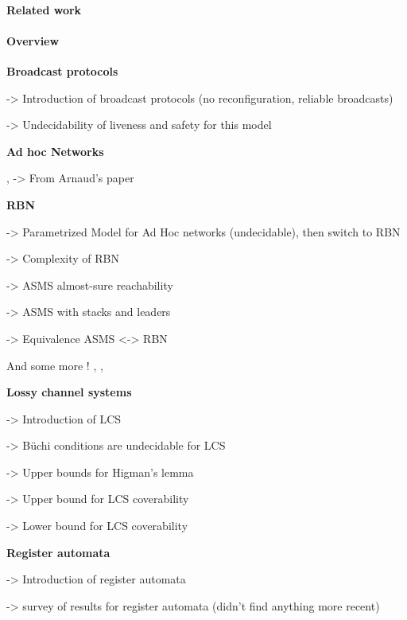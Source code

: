 \paragraph*{Related work}


\paragraph*{Overview}



	\textbf{Broadcast protocols}

	\cite{emerson1998model} -> Introduction of broadcast protocols (no reconfiguration, reliable broadcasts)
	
	\cite{EsparzaFM1999verification} -> Undecidability of liveness and safety for this model

	\textbf{Ad hoc Networks}

	\cite{Godskesen2007calculus}, \cite{Merro2007observational} -> From Arnaud's paper

	\textbf{RBN}
	
	\cite{DelzannoSZ2010Adhoc} -> Parametrized Model for Ad Hoc networks (undecidable), then switch to RBN
	
	\cite{Delzanno2012complexity} -> Complexity of RBN
	
	\cite{BouyerMRSS2016} -> ASMS almost-sure reachability
	
	\cite{fortin2017model} -> ASMS with stacks and leaders
	
	\cite{BalaW2021} -> Equivalence ASMS <-> RBN
	
	And some more ! \cite{BalasubramanianBM2018parameterized}, \cite{BalasubramanianGW2022parameterized}, 	\cite{ChiniMS2019liveness} 
	
	\textbf{Lossy channel systems}
	
	\cite{AbdullaJ1996verif} -> Introduction of LCS
	
	\cite{AbdullaJ1996undec} -> Büchi conditions are undecidable for LCS 
	
	\cite{SchmitzS2011upperHigman} -> Upper bounds for Higman's lemma
	
	\cite{ChambartS2008ordinal} -> Upper bound for LCS coverability 
	
	\cite{Schnoebelen2002verifying} -> Lower bound for LCS coverability 
	

	\textbf{Register automata}
	
	\cite{kaminski1994finite} -> Introduction of register automata
	
	\cite{segoufin2006automata} -> survey of results for register automata (didn't find anything more recent)
	

